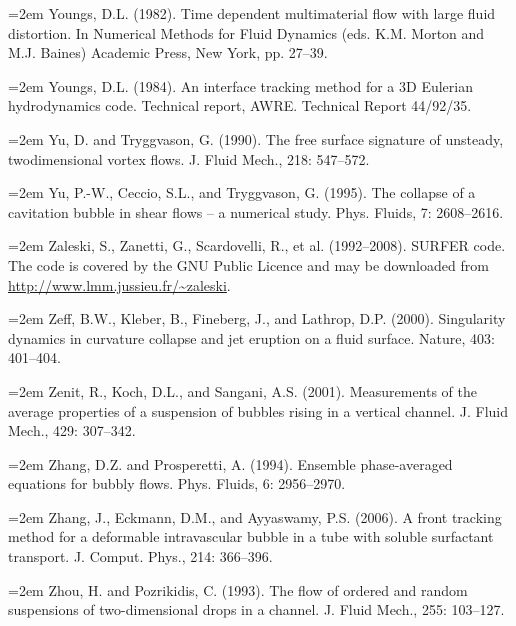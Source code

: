 \documentclass[11pt,a4paper,openany,fontset=none]{ctexbook}
\begin{document}
\par\hangindent=2em Youngs, D.L. (1982). Time dependent multimaterial flow with large fluid distortion. In Numerical Methods for Fluid Dynamics (eds. K.M. Morton and M.J. Baines) Academic Press, New York, pp. 27--39.

\par\hangindent=2em Youngs, D.L. (1984). An interface tracking method for a 3D Eulerian hydrodynamics code. Technical report, AWRE. Technical Report 44/92/35.

\par\hangindent=2em Yu, D. and Tryggvason, G. (1990). The free surface signature of unsteady, twodimensional vortex flows. J. Fluid Mech., 218: 547--572.

\par\hangindent=2em Yu, P.-W., Ceccio, S.L., and Tryggvason, G. (1995). The collapse of a cavitation bubble in shear flows -- a numerical study. Phys. Fluids, 7: 2608--2616.

\par\hangindent=2em Zaleski, S., Zanetti, G., Scardovelli, R., et al. (1992--2008). SURFER code. The code is covered by the GNU Public Licence and may be downloaded from \url{http://www.lmm.jussieu.fr/~zaleski}.

\par\hangindent=2em Zeff, B.W., Kleber, B., Fineberg, J., and Lathrop, D.P. (2000). Singularity dynamics in curvature collapse and jet eruption on a fluid surface. Nature, 403: 401--404.

\par\hangindent=2em Zenit, R., Koch, D.L., and Sangani, A.S. (2001). Measurements of the average properties of a suspension of bubbles rising in a vertical channel. J. Fluid Mech., 429: 307--342.

\par\hangindent=2em Zhang, D.Z. and Prosperetti, A. (1994). Ensemble phase-averaged equations for bubbly flows. Phys. Fluids, 6: 2956--2970.

\par\hangindent=2em Zhang, J., Eckmann, D.M., and Ayyaswamy, P.S. (2006). A front tracking method for a deformable intravascular bubble in a tube with soluble surfactant transport. J. Comput. Phys., 214: 366--396.

\par\hangindent=2em Zhou, H. and Pozrikidis, C. (1993). The flow of ordered and random suspensions of two-dimensional drops in a channel. J. Fluid Mech., 255: 103--127.
\end{document}
